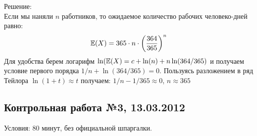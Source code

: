 \documentclass[12pt, a4paper]{article}\usepackage[]{graphicx}\usepackage[]{color}
\begin{document}
Решение: \\

Если мы наняли $n$ работников, то ожидаемое количество рабочих человеко-дней равно:
\begin{equation}
\mathbb{E}(X)=365\cdot n\cdot \left(\frac{364}{365}\right)^{n}
\end{equation}
Для удобства берем логарифм $\ln(\mathbb{E}(X)=c+\ln(n)+n\ln(364/365)$ и получаем условие первого порядка $1/n+\ln(364/365)=0$. Пользуясь разложением в ряд Тейлора $\ln(1+t)\approx t$ получаем: $1/n-1/365\approx 0$, $n\approx 365$








\subsection{Контрольная работа №3, 13.03.2012}

Условия: 80 минут, без официальной шпаргалки.
\end{document}
